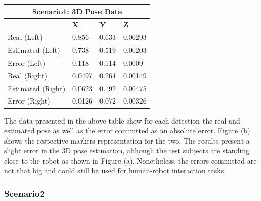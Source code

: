 \begin{table}[H]
  \centering
  \begin{tabular}{ |p{4cm}|p{2cm}|p{2cm}|p{2cm}|  }
    \hline
    \multicolumn{4}{|c|}{Scenario1: 3D Pose Data} \\
    \hline
    & \textbf{X} & \textbf{Y} & \textbf{Z} \\
    \hline
    Real (Left) & 0.856 & 0.633 & 0.00293 \\
    Estimated (Left) & 0.738 & 0.519 & 0.00203 \\
    Error (Left) & 0.118 & 0.114 & 0.0009 \\
    \hline
    Real (Right) & 0.0497 & 0.264 & 0.00149 \\
    Estimated (Right) & 0.0623 & 0.192 & 0.00475 \\
    Error (Right) & 0.0126 & 0.072 & 0.00326 \\
    \hline
  \end{tabular}
  \label{Scenario1 3D poses.}
\end{table}

The data presented in the above table show for each detection the real and estimated pose as well as the error committed as an absolute error. Figure (b) shows the respective markers representation for the two. The results present a slight error in the 3D pose estimation, although the test subjects are standing close to the robot as shown in Figure (a). Nonetheless, the errors committed are not that big and could still be used for human-robot interaction tasks.

\subsubsection{Scenario2}

